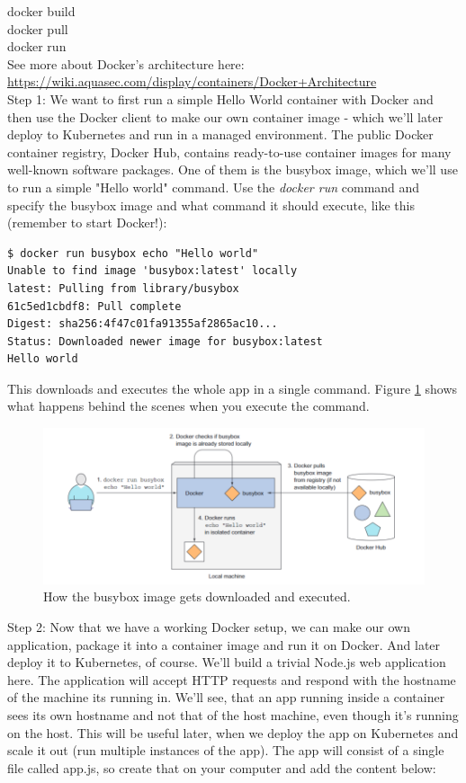 \documentclass[a4paper,10pt]{article}
\begin{document}
docker build \\
docker pull \\
docker run \\

See more about Docker's architecture here: \url{https://wiki.aquasec.com/display/containers/Docker+Architecture} \\

Step 1: We want to first run a simple Hello World container with Docker and then use the Docker client to make our own container image - which we'll later deploy to Kubernetes and run in a managed environment. The public Docker container registry, Docker Hub, contains ready-to-use container images for many well-known software packages. One of them is the busybox image, which we'll use to run a simple "Hello world" command. Use the \textit{docker run} command and specify the busybox image and what command it should execute, like this (remember to start Docker!):

\begin{lstlisting}[numbers=none, basicstyle=\ttfamily]
$ docker run busybox echo "Hello world"
Unable to find image 'busybox:latest' locally
latest: Pulling from library/busybox
61c5ed1cbdf8: Pull complete
Digest: sha256:4f47c01fa91355af2865ac10...
Status: Downloaded newer image for busybox:latest
Hello world
\end{lstlisting}

This downloads and executes the whole app in a single command. Figure \ref{fig:dockerhelloworld} shows what happens behind the scenes when you execute the command.\\

\begin{figure}
	\centering
	\includegraphics[width=0.8\linewidth]{docker_hello_world}
	\caption{How the busybox image gets downloaded and executed.}
	\label{fig:dockerhelloworld}
\end{figure}

Step 2: Now that we have a working Docker setup, we can make our own application, package it into a container image and run it on Docker. And later deploy it to Kubernetes, of course. We'll build a trivial Node.js web application here. The application will accept HTTP requests and respond with the hostname of the machine its running  in. We'll see, that an app running  inside a container sees its own hostname and not that of the host machine, even though it's running on the host. This will be useful later, when we deploy the app on Kubernetes and scale it out (run multiple instances of the app). The app will consist of a single file called app.js, so create that on your computer and add the content below:
\end{document}
